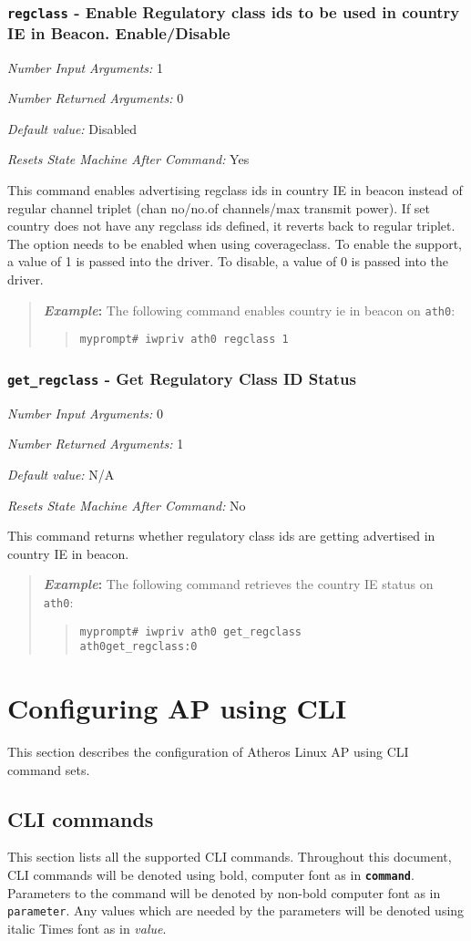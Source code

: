 \documentclass[10pt,fullpage]{article}
\newcommand{\mytt}[1]{{\texttt{#1}}}
\newcommand{\bv}{\begin{verse}}
\newcommand{\ev}{\end{verse}}
\newcommand{\cmd}[1]{{\texttt{myprompt\# #1}}}
\newcommand{\argdesc}[4]{\begin{description}
\itemsep -6pt
\item \textit{Number Input Arguments:} #1
\item \textit{Number Returned Arguments:} #2
\item \textit{Default value:} #3
\item \textit{Resets State Machine After Command:} #4
\end{description}
}
\newcommand{\clicmd}[1]{{\textbf{\texttt{#1}}}}
\newcommand{\cliparam}[1]{{\texttt{#1}}}
\newcommand{\clival}[1]{{\emph{#1}}}
\newenvironment{example}{\begin{quote}\textbf{\textit{Example}:}}{\end{quote}}
\begin{document}
\subsubsection{\mytt{regclass} - Enable Regulatory class ids to be used in country 
IE in Beacon. Enable/Disable}
\argdesc{1}{0}{Disabled}{Yes}
This command enables advertising regclass ids in country IE in beacon instead of 
regular channel triplet (chan no/no.of channels/max transmit power). If set 
country does not have any regclass ids defined, it reverts back to regular triplet. 
The option needs to be enabled when using coverageclass. To enable the support, a value 
of 1 is passed into the driver.  To disable, a value of 0 is passed into the driver.
\begin{example}
  The following command enables country ie in beacon  on \mytt{ath0}:
  \bv
  \cmd{iwpriv ath0 regclass 1}
  \ev
\end{example}

\subsubsection{\mytt{get\_regclass} - Get Regulatory Class ID Status}
\argdesc{0}{1}{N/A}{No}
This command returns whether regulatory class ids are getting advertised in country 
IE in beacon.
\begin{example}
  The following command retrieves the country IE status on \mytt{ath0}:
  \bv
  \cmd{iwpriv ath0 get\_regclass}\\
  \mytt{ath0\hspace{32pt}get\_regclass:0}
  \ev
\end{example}

\section{Configuring AP using CLI}
This section describes the configuration of Atheros Linux AP using CLI command sets.

\subsection{CLI commands}
This section lists all the supported CLI commands.  Throughout this
document, CLI commands will be denoted using bold, computer font as in
\clicmd{command}.  Parameters to the command will be denoted by
non-bold computer font as in \cliparam{parameter}.  Any values which
are needed by the parameters will be denoted using italic Times font
as in \clival{value}.
\end{document}
